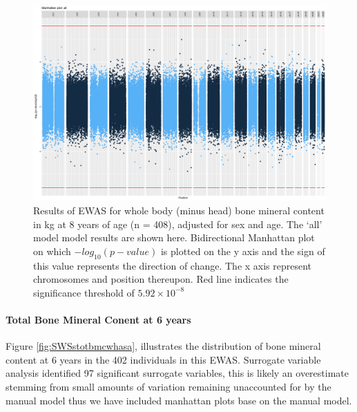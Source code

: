 \documentclass[
]{book}
\begin{document}
\begin{figure}

{\centering \includegraphics[width=0.8\linewidth]{figs/SWSttotbmcwhasaEPICewasManhattanAll} 

}

\caption{Results of EWAS for whole body (minus head) bone mineral content in kg at 8 years of age (n = 408), adjusted for sex and age. The `all' model model results are shown here. Bidirectional Manhattan plot on which \(-log_{10}(p-value)\) is plotted on the y axis and the sign of this value represents the direction of change. The x axis represent chromosomes and position thereupon. Red line indicates the significance threshold of \(5.92\times10^{-8}\)}\label{fig:SWSttotbmcwhasaEPICewasManhattanSVA}
\end{figure}



\hypertarget{total-bone-mineral-conent-at-6-years}{%
\paragraph{Total Bone Mineral Conent at 6 years}\label{total-bone-mineral-conent-at-6-years}}

Figure \ref{fig:SWSstotbmcwhasa}, illustrates the distribution of bone mineral content at 6 years in the 402 individuals in this EWAS.
Surrogate variable analysis identified 97 significant surrogate variables, this is likely an overestimate stemming from small amounts of variation remaining unaccounted for by the manual model thus we have included manhattan plots base on the manual model.
\end{document}
